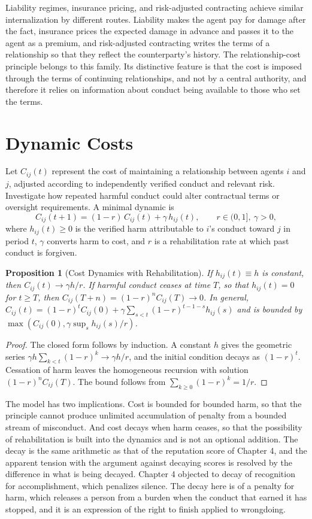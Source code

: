 \documentclass[11pt]{report}
\newtheorem{proposition}[theorem]{Proposition}
\theoremstyle{definition}
\theoremstyle{remark}
\begin{document}
Liability regimes, insurance pricing, and risk-adjusted contracting achieve similar internalization by different routes. Liability makes the agent pay for damage after the fact, insurance prices the expected damage in advance and passes it to the agent as a premium, and risk-adjusted contracting writes the terms of a relationship so that they reflect the counterparty's history. The relationship-cost principle belongs to this family. Its distinctive feature is that the cost is imposed through the terms of continuing relationships, and not by a central authority, and therefore it relies on information about conduct being available to those who set the terms.

\section{Dynamic Costs}

Let $C_{ij}(t)$ represent the cost of maintaining a relationship between agents $i$ and $j$, adjusted according to independently verified conduct and relevant risk. Investigate how repeated harmful conduct could alter contractual terms or oversight requirements. A minimal dynamic is
\[
C_{ij}(t+1)=(1-r)\,C_{ij}(t)+\gamma\,h_{ij}(t),\qquad r\in(0,1],\ \gamma>0,
\]
where $h_{ij}(t)\ge0$ is the verified harm attributable to $i$'s conduct toward $j$ in period $t$, $\gamma$ converts harm to cost, and $r$ is a rehabilitation rate at which past conduct is forgiven.

\begin{proposition}[Cost Dynamics with Rehabilitation]\label{prop:relcost}
If $h_{ij}(t)\equiv h$ is constant, then $C_{ij}(t)\to\gamma h/r$. If harmful conduct ceases at time $T$, so that $h_{ij}(t)=0$ for $t\ge T$, then $C_{ij}(T+n)=(1-r)^nC_{ij}(T)\to0$. In general, $C_{ij}(t)=(1-r)^tC_{ij}(0)+\gamma\sum_{s<t}(1-r)^{t-1-s}h_{ij}(s)$ and is bounded by $\max(C_{ij}(0),\gamma\sup_sh_{ij}(s)/r)$.
\end{proposition}

\begin{proof}
The closed form follows by induction. A constant $h$ gives the geometric series $\gamma h\sum_{k<t}(1-r)^k\to\gamma h/r$, and the initial condition decays as $(1-r)^t$. Cessation of harm leaves the homogeneous recursion with solution $(1-r)^nC_{ij}(T)$. The bound follows from $\sum_{k\ge0}(1-r)^k=1/r$.
\end{proof}

The model has two implications. Cost is bounded for bounded harm, so that the principle cannot produce unlimited accumulation of penalty from a bounded stream of misconduct. And cost decays when harm ceases, so that the possibility of rehabilitation is built into the dynamics and is not an optional addition. The decay is the same arithmetic as that of the reputation score of Chapter 4, and the apparent tension with the argument against decaying scores is resolved by the difference in what is being decayed. Chapter 4 objected to decay of recognition for accomplishment, which penalizes silence. The decay here is of a penalty for harm, which releases a person from a burden when the conduct that earned it has stopped, and it is an expression of the right to finish applied to wrongdoing.
\end{document}
